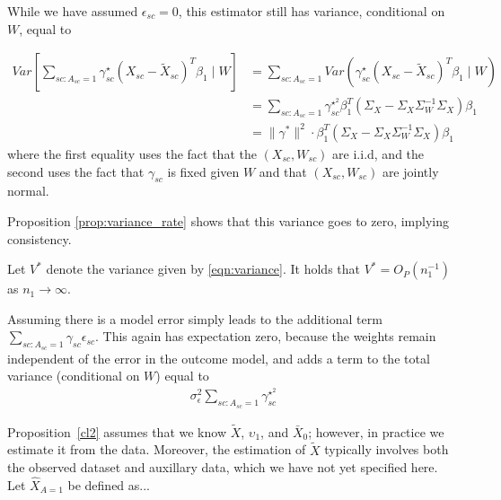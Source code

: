 \begin{remark}
While we have assumed $\epsilon_{sc}=0$, this estimator still has variance, conditional on $W$, equal to

\begin{align}
\nonumber Var[\sum_{sc: A_{sc} = 1}\gamma_{sc}^\star(X_{sc} - \tilde{X}_{sc})^T\beta_1 \mid W] &= \sum_{sc: A_{sc} = 1} Var(\gamma_{sc}^\star(X_{sc} - \tilde{X}_{sc})^T\beta_1 \mid W) \\
\nonumber &= \sum_{sc: A_{sc} = 1} \gamma_{sc}^{\star^2}\beta_1^T(\Sigma_{X} - \Sigma_{X}\Sigma_{W}^{-1}\Sigma_{X})\beta_1  \\
& = \|\gamma^*\|^2 \cdot \beta_1^T(\Sigma_{X} - \Sigma_{X}\Sigma_{W}^{-1}\Sigma_{X})\beta_1  \label{eqn:variance}
\end{align}
%
where the first equality uses the fact that the $(X_{sc}, W_{sc})$ are i.i.d, and the second uses the fact that $\gamma_{sc}$ is fixed given $W$ and that $(X_{sc}, W_{sc})$ are jointly normal. %
\end{remark}


Proposition \ref{prop:variance_rate} shows that this variance goes to zero, implying consistency. 
\begin{proposition}\label{prop:variance_rate}
Let $V^*$ denote the variance given by \eqref{eqn:variance}. It holds that $V^* = O_P(n_1^{-1})$ as $n_1 \rightarrow \infty$.
\end{proposition}



\begin{remark}
    Assuming there is a model error simply leads to the additional term $\sum_{sc: A_{sc} = 1}\gamma_{sc}\epsilon_{sc}$. This again has expectation zero, because the weights remain independent of the error in the outcome model, and adds a term to the total variance (conditional on $W$) equal to
    \begin{align*}
    \sigma^2_{\epsilon}\sum_{sc: A_{sc} = 1}\gamma_{sc}^{\star^2}
    \end{align*}
\end{remark}

Proposition~\ref{cl2} assumes that we know $\tilde{X}$, $\upsilon_1$, and $\bar{X}_0$; however, in practice we estimate it from the data. Moreover, the estimation of $\tilde{X}$ typically involves both the observed dataset and auxillary data, which we have not yet specified here. Let $\hat{X}_{A=1}$ be defined as...

